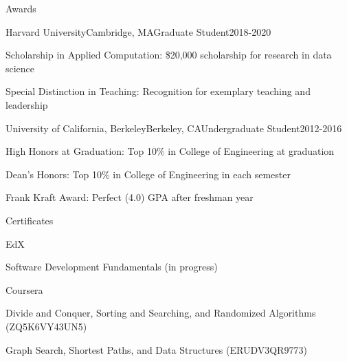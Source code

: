 \documentclass{resume} %
\begin{document}
\begin{rSection}{Awards}

\begin{rSubsection}{Harvard University}{Cambridge, MA}{Graduate Student}{2018-2020}
	\item Scholarship in Applied Computation: \$20,000 scholarship for research in data science
	\item Special Distinction in Teaching: Recognition for exemplary teaching and leadership
\end{rSubsection}
\begin{rSubsection}{University of California, Berkeley}{Berkeley, CA}{Undergraduate Student}{2012-2016}
	\item High Honors at Graduation: Top 10\% in College of Engineering at graduation
	\item Dean's Honors: Top 10\% in College of Engineering in each semester
	\item Frank Kraft Award: Perfect (4.0) GPA after freshman year
\end{rSubsection}

\end{rSection}

\begin{rSection}{Certificates}

\begin{rSubsection}{EdX}{}{}{}
	\item Software Development Fundamentals (in progress)
\end{rSubsection}
\begin{rSubsection}{Coursera}{}{}{}
	\item Divide and Conquer, Sorting and Searching, and Randomized Algorithms (ZQ5K6VY43UN5)
	\item Graph Search, Shortest Paths, and Data Structures (ERUDV3QR9773)
\end{rSubsection}

\end{rSection}
\end{document}
